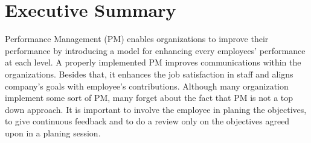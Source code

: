 \section*{Executive Summary}
Performance Management (PM)  enables  organizations to improve their performance by introducing a model for enhancing every employees' performance at each level. A properly implemented PM  improves communications within the organizations.
 Besides that, it enhances the job satisfaction in staff and aligns company's goals with employee's contributions. Although many organization implement some sort of PM, many forget about the fact that
PM is not a top down approach. It is important to involve the employee in planing the objectives, to give continuous feedback and  to do a review only on the objectives agreed upon in a planing session.